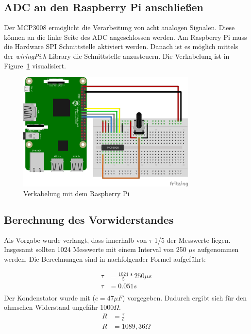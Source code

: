 \documentclass{article}
\begin{document}
\newpage
\subsection{ADC an den Raspberry Pi anschließen}
Der MCP3008 ermöglicht die Verarbeitung von acht analogen Signalen. Diese können an die linke Seite des ADC angeschlossen werden.
Am Raspberry Pi muss die Hardware SPI Schnittstelle aktiviert werden.
Danach ist es möglich mittels der \textit{wiringPi.h} Library die Schnittstelle anzusteuern.
Die Verkabelung ist in Figure~\ref{fig:ADC-Verkabelung} visualisiert.

\begin{figure}[h!]
    \centering
    \includegraphics[width=0.8\textwidth]{RPi-Fritzing-Potentiometer_bb.png}
    \caption{Verkabelung mit dem Raspberry Pi}
    \label{fig:ADC-Verkabelung}
\end{figure}

\subsection{Berechnung des Vorwiderstandes}
Als Vorgabe wurde verlangt, dass innerhalb von $\tau$ 1/5 der Messwerte liegen. 
Insgesamt sollten 1024 Messwerte mit einem Interval von 250 $\mu$s aufgenommen werden.
Die Berechnungen sind in nachfolgender Formel aufgeführt:

\begin{align*}
    \tau &=\frac{1024}{5} * 250\mu s\\
    \tau &=0.051s\\
\end{align*}
Der Kondenstator wurde mit ($c=47\mu F$) vorgegeben. Dadurch ergibt sich für den ohmschen Widerstand ungefähr 1000$\Omega$.
\begin{align*}
    R &= \frac{\tau}{c}\\
    R &= 1089,36\Omega\\
\end{align*}
\end{document}
